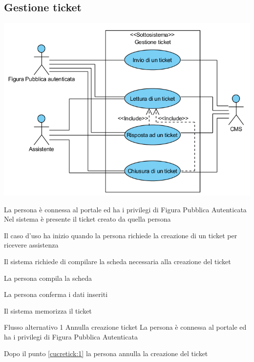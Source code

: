 \subsection{Gestione ticket}
\begin{center}
   \includegraphics[width=\textwidth]{assets/visualParadigm/cu/GestioneTicket}
\end{center}
{}
{La persona è connessa al portale ed ha i privilegi di Figura Pubblica Autenticata}
{Nel sistema è presente il ticket creato da quella persona}
{\begin{enumCU}
	\item Il caso d'uso ha inizio quando la persona richiede la creazione di un ticket per ricevere assistenza
	\item Il sistema richiede di compilare la scheda necessaria alla creazione del ticket
	\item La persona compila la scheda\label{cucretick:1}
	\item La persona conferma i dati inseriti
	\item Il sistema memorizza il ticket
\end{enumCU}}
%
{Flusso alternativo 1}%
{Annulla creazione ticket}%
{La persona è connessa al portale ed ha i privilegi di Figura Pubblica Autenticata}%
{\postNulle}%
{\begin{enumCU}
		\item Dopo il punto \ref{cucretick:1} la persona annulla la creazione del ticket
	\end{enumCU}}%


